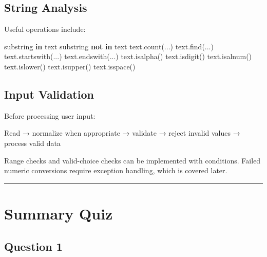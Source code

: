 \documentclass[
  11pt,
  a4paper,
]{article}
\newenvironment{Shaded}{}{}
\newcommand{\KeywordTok}[1]{\textcolor[rgb]{0.00,0.44,0.13}{\textbf{#1}}}
\newcommand{\NormalTok}[1]{#1}
\begin{document}
\subsection{String Analysis}\label{string-analysis}

Useful operations include:

\begin{Shaded}
\begin{Highlighting}[]
\NormalTok{substring }\KeywordTok{in}\NormalTok{ text}
\NormalTok{substring }\KeywordTok{not} \KeywordTok{in}\NormalTok{ text}
\NormalTok{text.count(...)}
\NormalTok{text.find(...)}
\NormalTok{text.startswith(...)}
\NormalTok{text.endswith(...)}
\NormalTok{text.isalpha()}
\NormalTok{text.isdigit()}
\NormalTok{text.isalnum()}
\NormalTok{text.islower()}
\NormalTok{text.isupper()}
\NormalTok{text.isspace()}
\end{Highlighting}
\end{Shaded}

\subsection{Input Validation}\label{input-validation}

Before processing user input:

\begin{Shaded}
\begin{Highlighting}[]
\NormalTok{Read}
\NormalTok{→ normalize when appropriate}
\NormalTok{→ validate}
\NormalTok{→ reject invalid values}
\NormalTok{→ process valid data}
\end{Highlighting}
\end{Shaded}

Range checks and valid-choice checks can be implemented with conditions.
Failed numeric conversions require exception handling, which is covered
later.

\begin{center}\rule{0.5\linewidth}{0.5pt}\end{center}

\section{Summary Quiz}\label{summary-quiz}

\subsection{Question 1}\label{question-1-8}
\end{document}
